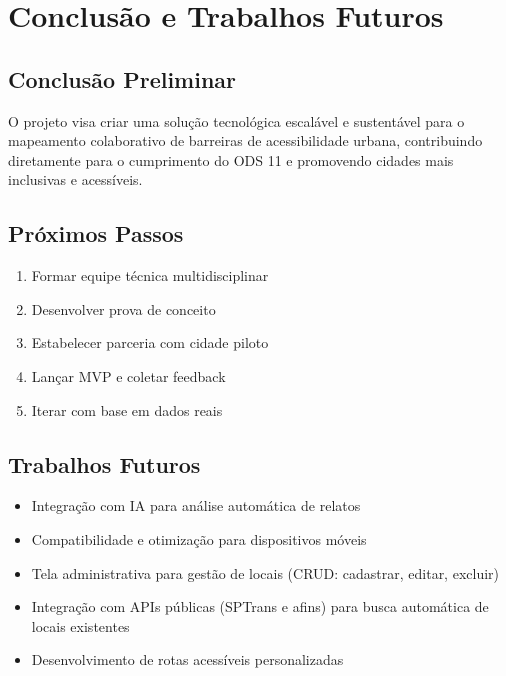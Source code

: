 \documentclass[12pt,a4paper]{article}
\begin{document}
\section{Conclusão e Trabalhos Futuros}
\label{sec:conclusao}

\subsection{Conclusão Preliminar}

O projeto visa criar uma solução tecnológica escalável e sustentável para o mapeamento colaborativo de barreiras de acessibilidade urbana, contribuindo diretamente para o cumprimento do ODS 11 e promovendo cidades mais inclusivas e acessíveis.

\subsection{Próximos Passos}

\begin{enumerate}
    \item Formar equipe técnica multidisciplinar
    \item Desenvolver prova de conceito
    \item Estabelecer parceria com cidade piloto
    \item Lançar MVP e coletar feedback
    \item Iterar com base em dados reais
\end{enumerate}

\subsection{Trabalhos Futuros}

\begin{itemize}
    \item Integração com IA para análise automática de relatos
    \item Compatibilidade e otimização para dispositivos móveis
    \item Tela administrativa para gestão de locais (CRUD: cadastrar, editar, excluir)
    \item Integração com APIs públicas (SPTrans e afins) para busca automática de locais existentes
    \item Desenvolvimento de rotas acessíveis personalizadas
\end{itemize}
\end{document}
